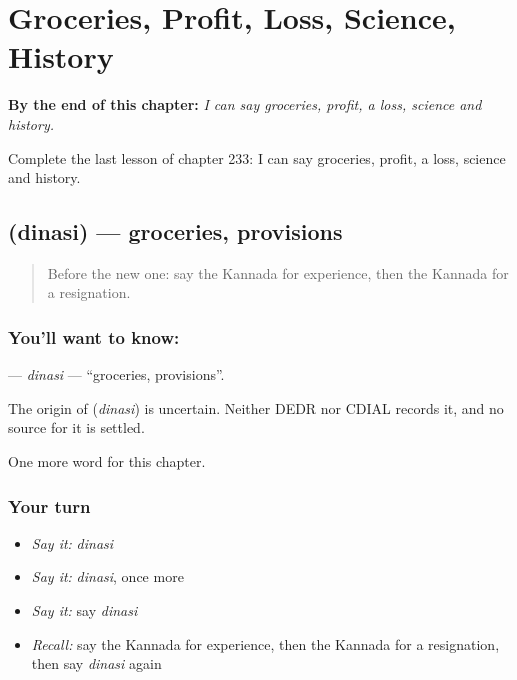 
\chapter{Groceries, Profit, Loss, Science, History}
\label{ch:ka-groceries-profit-loss-science-history}

\begin{chapteropening}
\textbf{By the end of this chapter:} \emph{I can say groceries, profit, a loss, science and history.}

Complete the last lesson of chapter 233: I can say groceries, profit, a loss, science and history.
\end{chapteropening}

\section[\texorpdfstring{\kn{ದಿನಸಿ} (dinasi)}{ದಿನಸಿ (dinasi)}]{ (dinasi) — groceries, provisions}

\label{lesson:KA-C233-dinasi}



\begin{quote}
Before the new one: say the Kannada for experience, then the Kannada for a resignation.
\end{quote}

\subsection*{You'll want to know: }
\textbf{} — \emph{dinasi} — \textquotedblleft{}groceries, provisions\textquotedblright{}.

\begin{cousinweb}
The origin of \textbf{} (\emph{dinasi}) is uncertain. Neither DEDR nor CDIAL records it, and no source for it is settled.
\end{cousinweb}

\begin{grammarlens}[title={What you've built}]
One more word for this chapter.
\end{grammarlens}

\subsection*{Your turn}
\begin{itemize}
\raggedright
  \item \emph{Say it:} \emph{dinasi}
  \item \emph{Say it:} \emph{dinasi}, once more
  \item \emph{Say it:} say \emph{dinasi}
  \item \emph{Recall:} say the Kannada for experience, then the Kannada for a resignation, then say \emph{dinasi} again
\end{itemize}

